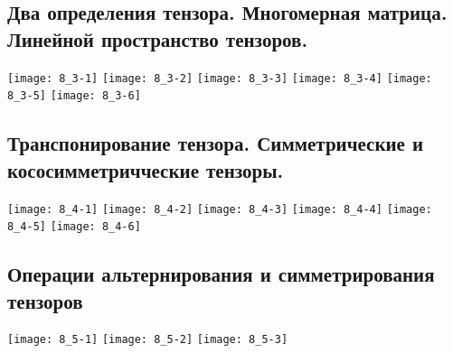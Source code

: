 \documentclass[../main.tex]{subfiles}
\begin{document}
	\subsection{Два определения тензора. Многомерная матрица. Линейной пространство тензоров.}
	 		\texttt{[image: 8\_3-1]}	
		\newline
		\texttt{[image: 8\_3-2]}	
		\newline
		\texttt{[image: 8\_3-3]}	
		\newline
		\texttt{[image: 8\_3-4]}	
		\newline
		\texttt{[image: 8\_3-5]}	
		\newline
		\texttt{[image: 8\_3-6]}	
		\newline			
		
		
	\subsection{Транспонирование тензора. Симметрические и кососимметричческие тензоры.}
	 	\texttt{[image: 8\_4-1]}	
		\newline
		\texttt{[image: 8\_4-2]}	
		\newline
		\texttt{[image: 8\_4-3]}	
		\newline
		\texttt{[image: 8\_4-4]}	
		\newline
		\texttt{[image: 8\_4-5]}	
		\newline
		\texttt{[image: 8\_4-6]}	
		\newline			
		
		
	\subsection{Операции альтернирования и симметрирования тензоров}
	 	\texttt{[image: 8\_5-1]}	
		\newline
		\texttt{[image: 8\_5-2]}	
		\newline
		\texttt{[image: 8\_5-3]}	
		\newline
\end{document}
